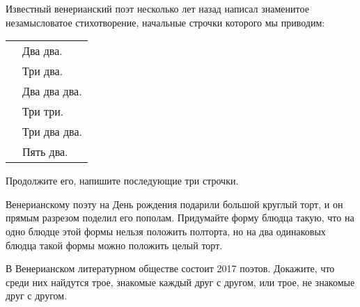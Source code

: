 ﻿
\begin{itemize}

\itA Известный венерианский поэт несколько лет назад написал знаменитое незамысловатое стихотворение, начальные строчки которого мы приводим:

\begin{tabular}{ll}
\hspace{2.4cm} & Два два. \\
	& Три два. \\
	& Два два два. \\
	& Три три. \\
	& Три два два. \\
	& Пять два.
\end{tabular}

Продолжите его, напишите последующие три строчки.

\itB Венерианскому поэту на День рождения подарили большой круглый торт, и он прямым разрезом поделил его пополам. Придумайте форму блюдца такую, что на одно блюдце этой формы нельзя положить полторта, но на два одинаковых блюдца такой формы можно положить целый торт.

\itC В Венерианском литературном обществе состоит 2017 поэтов. Докажите, что среди них найдутся трое, знакомые каждый друг с другом, или трое, не знакомые друг с другом.
\end{itemize}